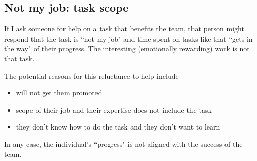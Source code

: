 \subsection{Not my job: task scope}


If I ask someone for help on a task that benefits the team, that person might respond that the task is ``not my job" and time spent on tasks like that ``gets in the way" of their progress. The interesting (emotionally rewarding) work is not that task.

The potential reasons for this reluctance to help include
\begin{itemize}
    \item will not get them promoted
    \item scope of their job and their expertise does not include the task
    \item they don't know how to do the task and they don't want to learn
\end{itemize}
In any case, the individual's ``progress" is not aligned with the success of the team.